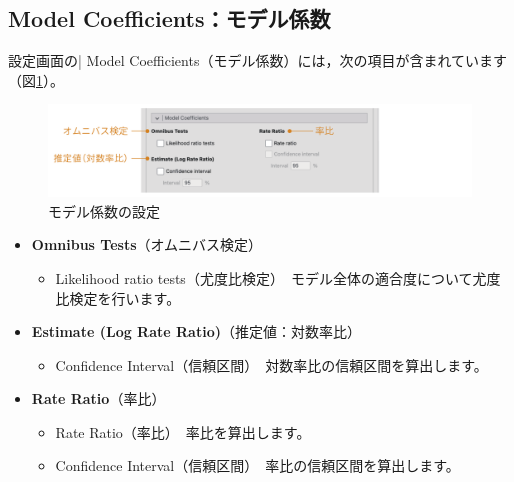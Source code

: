 \documentclass[
  12pt,
  a5jpaper,
  lualatex, ja=standard]{bxjsbook}
\providecommand{\tightlist}{%
  \setlength{\itemsep}{0pt}\setlength{\parskip}{0pt}}
\newenvironment{jmvsettings}{%
	\begin{center}%
	\begin{tcolorbox}[%
		title=設定項目,
		colframe=gmoji,
		colbacktitle=gmoji,
		colback=gmoji!2!white,
		breakable,
		width=.9\textwidth,
		]\small\addtolength{\leftmargini}{-3\labelsep}%
	}%
	{\end{tcolorbox}\end{center}}
\begin{document}
\hypertarget{sub:frequencies-loglin-coeff}{%
\subsection{Model Coefficients：モデル係数}\label{sub:frequencies-loglin-coeff}}

設定画面の\colorbox{bar}{\textcolor{gmoji2}{| Model Coefficients}}（モデル係数）には，次の項目が含まれています（図\ref{fig:frequencies-loglin-coeff}）。

\begin{figure}[!ht]

{\centering \includegraphics[width=1\linewidth]{images/frequencies/loglin-coeff} 

}

\caption{モデル係数の設定}\label{fig:frequencies-loglin-coeff}
\end{figure}

\begin{jmvsettings}

\begin{itemize}
\tightlist
\item
  \textbf{Omnibus Tests}（オムニバス検定）

  \begin{itemize}
  \tightlist
  \item
    Likelihood ratio tests（尤度比検定）　モデル全体の適合度について尤度比検定を行います。
  \end{itemize}
\item
  \textbf{Estimate (Log Rate Ratio)}（推定値：対数率比）

  \begin{itemize}
  \tightlist
  \item
    Confidence Interval（信頼区間）　対数率比の信頼区間を算出します。
  \end{itemize}
\item
  \textbf{Rate Ratio}（率比）

  \begin{itemize}
  \tightlist
  \item
    Rate Ratio（率比）　率比を算出します。
  \item
    Confidence Interval（信頼区間）　率比の信頼区間を算出します。
  \end{itemize}
\end{itemize}

\end{jmvsettings}
\end{document}
